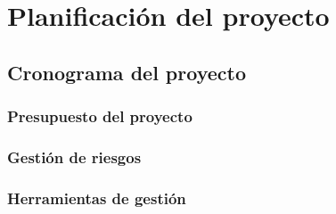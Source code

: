 \chapter{Planificación del proyecto}\label{cap:planificacion}

\section{Cronograma del proyecto}

\subsection{Presupuesto del proyecto}

\subsection{Gestión de riesgos}

\subsection{Herramientas de gestión}